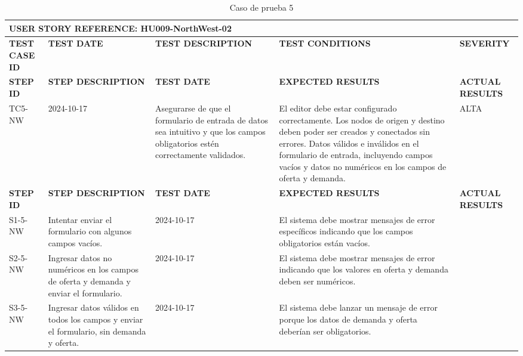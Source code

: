 \documentclass[stu, 12pt, letterpaper, donotrepeattitle, floatsintext, natbib]{apa7}
\begin{document}
\begin{longtable}{|p{2cm}|p{3cm}|p{3cm}|p{3cm}|p{3cm}|}
    \caption{Caso de prueba 5} \label{tab:casos_prueba5} \\
    \hline
    \multicolumn{5}{|l|}{\textbf{USER STORY REFERENCE: HU009-NorthWest-02}} \\ \hline
    \textbf{TEST CASE ID} & \textbf{TEST DATE} & \textbf{TEST DESCRIPTION} & \textbf{TEST CONDITIONS} & \textbf{SEVERITY} \\ \hline
    \endfirsthead
    \hline
    \textbf{STEP ID} & \textbf{STEP DESCRIPTION} & \textbf{TEST DATE} & \textbf{EXPECTED RESULTS} & \textbf{ACTUAL RESULTS} \\ \hline
    \endhead
    TC5-NW & 2024-10-17 & Asegurarse de que el formulario de entrada de datos sea intuitivo y que los campos obligatorios estén correctamente validados. & El editor debe estar configurado correctamente. Los nodos de origen y destino deben poder ser creados y conectados sin errores. Datos válidos e inválidos en el formulario de entrada, incluyendo campos vacíos y datos no numéricos en los campos de oferta y demanda. & ALTA \\ \hline
    \textbf{STEP ID} & \textbf{STEP DESCRIPTION} & \textbf{TEST DATE} & \textbf{EXPECTED RESULTS} & \textbf{ACTUAL RESULTS} \\ \hline
    S1-5-NW & Intentar enviar el formulario con algunos campos vacíos. & 2024-10-17 & El sistema debe mostrar mensajes de error específicos indicando que los campos obligatorios están vacíos. & \\ \hline
    S2-5-NW & Ingresar datos no numéricos en los campos de oferta y demanda y enviar el formulario. & 2024-10-17 & El sistema debe mostrar mensajes de error indicando que los valores en oferta y demanda deben ser numéricos. & \\ \hline
    S3-5-NW & Ingresar datos válidos en todos los campos y enviar el formulario, sin demanda y oferta. & 2024-10-17 & El sistema debe lanzar un mensaje de error porque los datos de demanda y oferta deberían ser obligatorios. & \\ \hline
\end{longtable}

\small %
\renewcommand{\arraystretch}{1.0} %
\setlength{\tabcolsep}{4pt} %
\end{document}
